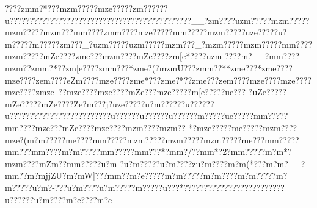 {{{{{{{{{{{{{{{{{{{{{{{{{{{{{{{{{{{{{{{{{{{{{{{{{{{{{{{{{{{{{{{{{{{{{{{{{{{{{{{{{{{{{{{{{{{{{{{{{{{{{{{{{{{{{{{{{{{{{{{{{{{{{{{{{{{{{{{{{{{{{{{{{{{{{{{{{{{{{{{{{{{{{{{{{{{{{{{{{{{{{{{{{{{{{{{{{{{{{{{{{{{{{{{{{{{{{{{{{{{{{{{{{{{{{{{{{{{{{{{{{{{{{{{{{{{{{{{{{{{{{{{{{{{{{{{{{{{{{{{{{{{{{{{{{{{{{{{{{{{{{{{{{{{{{{{{{{{{{{{{{{{{{{{{{{{{{{{{{{{{{{{{{{{{{{{{{{{{{{{{{{{{{{{{{{{{{{{{{{{{{{{{{{{{{{{{{{{{{{{{{{{{{{{{{{{{{{{{{{{{{{{{{{{{{{{{{{{{{{{{{{{{{{{{{{{{{{{{{{{{{{{{{{{{{{{{{{{{{{{{{{{{{{{{{{{{{{{{{{{{{{{{{{{{{{{{{{{{{{{{{{{{{{{{{{{{{{{{{{{{{{{{{{{{{{{{{{{{{{{{{{{{{{{{{{{{{{{{{{{{{{{{{{{{{{{{{{{{{{{{{{{{{{{{{{{{{{{{{{{{{{{{{{{{{{{{{{{{{{{{{{{{{{{{{{{{{{{{{{{{{{{{{{{{{{{{{{{{{{{{{{{{{{{{{{{{{{{{{{{{{{{{{{{{{{{{{{{{{{{{{{{{{{{{{{{{{{{{{{{{{{{{{{{{{{{{{{{{{{{{{{{{{{{{{{{{{{{{{{{{{{{{{{{{{{{{{{{{{{{{{{{{{{{{{{{{{{{{{{{{{{{{{{{{{{{{{{{{{{{{{{{{{{{{{{{{{{{{{{{{{{{{{{{{{{{{{{{{{{{{{{{{{{{{{{{{{{{{{{{{{{{{{{{{{{{{{{{{{{{{{{{{{{{{{{{{{{{{{{{{{{{{{{{{{{{{{{{{{{{{{{{{{{{{{{{{{{{{{{{{{{{{{{{{{{{{{{{{{{{{{{{{{{{{{{{{{{{{{{{{{{{{{{{{{{{{{{{{{{{{{{{{{{{{{{{{{{{{{{{{{{{{{{{{{{{{{{{{{{{{{{{{{{{{{{{{{{{{{{{{{{{{{{{{{{{{{{{{{{{{{{{{{{{{{{{{{{{{{{{{{{{{{{{{{{{{{{{{{{{{{{{{{{{{{{{{{{{{{{{{{{{{{{{{{{{{{{{{{{{{{{{{{{{{{{{{{{{{{{{{{{{{{{{{{{{{{{{{{{{{{{{{{{{{{{{{{{{{{{{{{{{{{{{{{{{{{{{{{{{{{{{{{{{{{{{{{{{{{{{{{{{{{{{{{{{{{{{{{{{{{{{{{{{{{{{{{{{{{{{{{{{{{{{{{{{{{{{{{{{{{{{{{{{{{{{{{{{{{{{{{{{{{{{{{{{{{{{{{{{{{{{{{{{{{{{{{{{{{{{{{{{{{{{{{{{{{{{{{{{{{{{{{{{{{{{{{{{{{{{{{{{{{{{{{{{{{{{{{{{{{{{{{{{{{{{{{{{{{{{{{{{{{{{{{{{{{{{{{{{{{{{{{{{{{{{{{{{{{{{{{{{{{{{{{{{{{{{{{{{{{{{{{{{{{{{{{{{{{{{{{{{{{{{{{{{{{{{{{{{{{{{{{{{{{{{{{{{{{{{{{{{{{{{{{{{{{{{{{{{{{{{{{{{{{{{{{{{{{{{{{{{{{{{{{{{{{{{{{{{{{{{{{{{{{{{{{{{{{{{{{{{{{{{{{{{{{{{{{{{{{{{{{{{{{{{{{{{{{{{{{{{{{{{{{{{{{{{{{{{{{{{{{{{{{{{{{{{{{{{{{{{{{{{{{{{{{{{{{{{{{{{{{{{{{{{{{{{{{{{{{{{{{{{{{{{{{{{{{{{{{{{{{{{{{{{{{{{{{{{{{{{{{{{{{{{{{{{{{{{{{{{{{{{{{{{{{{{{{{{{{{{{{{{{{{{{{{{{{{{{{{{{{{{{{{{{{{{{{{{{{{{{{{{{{{{{{{{{{{{{{{{{{{{{{{{{{{{{{{{{{{{{{{{{{{{{{{{{{{{{{{{{{{{{{{{{{{{{{{{{{{{{{{{{{{{{{{{{{{{{{{{{{{{{{{{{{{{{{{{{{{{{{{{{{{{{{{{{{{{{{{{{{{{{{{{{{{{{{{{{{{{{{{{{{{{{{{{{{{{{{{{{{{{{{{{{{{{{{{{{{{{{????zm{m?*???mzm?????mze?????}zm?????}?u??????}?????????????????????????????????????}??__?}zm????uzm?????mzm?????mzm?????mzm???m{m????zm{m????{mze?????m{m?????mzm?????uze?????u?m????}?m?????}zm???_?uzm?????uzm?????mzm???_?mzm?????mzm?????m{m????mzm?????mZe????zm{e???{mzm????{mZe????zm[e*????uzm-???}?m?__?m{m ????mzm??zm{m?*??zm[e????zm{m???*zm{e ? (?mzmU???zm{m??**zm{e???*zm{e????{mze????ze{m????{eZm????{mze????zm{e*???zm{e?*??zm{e ???ze{m????{mze????{mze????{mze????zmze~??{mze????{mze????mZe???mze?????m[e?????u{e???
?uZe?????mZe?????mZe????Ze?m???j?uze?????u?m?????}?u??????u???????}???????}?????}??????u??????u?????}?u?????}?m?????u{e?????m{m?????m{m????mze???mZe????{mze????{mzm????{mzm??
*?mze?????m{e?????mzm????{mze? ({m?m?????m{e??? ?m{m?????mzm?????mzm?????mzm?????m{e???m{m?????m{m???m{m????{m?m?????m{m?????m{m???*?m{m?/ ??m{m *?2?m{m?????m?m * ?mzm????mZm??m{m?????u?m
?u?m?????u?m????zu?m????m?m(*???m?m?__?m{m?? {m?mjjZU?m?mW]???m{m?   ?m?e?????m?m?????m?m????m?m?????m?m?????u?m?-???u?m ????u?m????}?m??? ?}?u???*??}??????}??????}??????}?????u?}?????u?m????m?e ????m?e
  }}}}}}}}}}}}}}}}}}}}}}}}}}}}}}}}}}}}}}}}}}}}}}}}}}}}}}}}}}}}}}}}}}}}}}}}}}}}}}}}}}}}}}}}}}}}}}}}}}}}}}}}}}}}}}}}}}}}}}}}}}}}}}}}}}}}}}}}}}}}}}}}}}}}}}}}}}}}}}}}}}}}}}}}}}}}}}}}}}}}}}}}}}}}}}}}}}}}}}}}}}}}}}}}}}}}}}}}}}}}}}}}}}}}}}}}}}}}}}}}}}}}}}}}}}}}}}}}}}}}}}}}}}}}}}}}}}}}}}}}}}}}}}}}}}}}}}}}}}}}}}}}}}}}}}}}}}}}}}}}}}}}}}}}}}}}}}}}}}}}}}}}}}}}}}}}}}}}}}}}}}}}}}}}}}}}}}}}}}}}}}}}}}}}}}}}}}}}}}}}}}}}}}}}}}}}}}}}}}}}}}}}}}}}}}}}}}}}}}}}}}}}}}}}}}}}}}}}}}}}}}}}}}}}}}}}}}}}}}}}}}}}}}}}}}}}}}}}}}}}}}}}}}}}}}}}}}}}}}}}}}}}}}}}}}}}}}}}}}}}}}}}}}}}}}}}}}}}}}}}}}}}}}}}}}}}}}}}}}}}}}}}}}}}}}}}}}}}}}}}}}}}}}}}}}}}}}}}}}}}}}}}}}}}}}}}}}}}}}}}}}}}}}}}}}}}}}}}}}}}}}}}}}}}}}}}}}}}}}}}}}}}}}}}}}}}}}}}}}}}}}}}}}}}}}}}}}}}}}}}}}}}}}}}}}}}}}}}}}}}}}}}}}}}}}}}}}}}}}}}}}}}}}}}}}}}}}}}}}}}}}}}}}}}}}}}}}}}}}}}}}}}}}}}}}}}}}}}}}}}}}}}}}}}}}}}}}}}}}}}}}}}}}}}}}}}}}}}}}}}}}}}}}}}}}}}}}}}}}}}}}}}}}}}}}}}}}}}}}}}}}}}}}}}}}}}}}}}}}}}}}}}}}}}}}}}}}}}}}}}}}}}}}}}}}}}}}}}}}}}}}}}}}}}}}}}}}}}}}}}}}}}}}}}}}}}}}}}}}}}}}}}}}}}}}}}}}}}}}}}}}}}}}}}}}}}}}}}}}}}}}}}}}}}}}}}}}}}}}}}}}}}}}}}}}}}}}}}}}}}}}}}}}}}}}}}}}}}}}}}}}}}}}}}}}}}}}}}}}}}}}}}}}}}}}}}}}}}}}}}}}}}}}}}}}}}}}}}}}}}}}}}}}}}}}}}}}}}}}}}}}}}}}}}}}}}}}}}}}}}}}}}}}}}}}}}}}}}}}}}}}}}}}}}}}}}}}}}}}}}}}}}}}}}}}}}}}}}}}}}}}}}}}}}}}}}}}}}}}}}}}}}}}}}}}}}}}}}}}}}}}}}}}}}}}}}}}}}}}}}}}}}}}}}}}}}}}}}}}}}}}}}}}}}}}}}}}}}}}}}}}}}}}}}}}}}}}}}}}}}}}}}}}}}}}}}}}}}}}}}}}}}}}}}}}}}}}}}}}}}}}}}}}}}}}}}}}}}}}}}}}}}}}}}}}}}}}}}}}}}}}}}}}}}}}}}}}}}}}}}}}}}}}}}}}}}}}}}}}}}}}}}}}}}}}}}}}}}}}}}}}}}}}}}}}}}}}}}}}}}}}}}}}}}}}}}}}}}}}}}}}}}}}}}}}}}}}}}}}}}}}}}}}}}}}}}}}}}}}}}}}}}}}}}}}}}}}}}}}}}}}}}}}}}}}}}}}}}}}}}}}}}}}}}}}}}}}}}}}}}}}}}}}}}}}}}}}}}}}}}}}}}}}}}}}}}}}}}}}}}}}}}}}}}}}}}}}}}}}}}}}}}}}}}}}}}}}}}}}}}}}}}}}}}}}}}}}}}}}}}}}}}}}}}}}}}}}}}}}}}}}}}}}}}}}}}}}}}}}}}}}}}}}}}}}}}}}}}}}}}}}}}}}}}}}}}}}}}}}}}}}}}}}}}}}}}}}}}}}}}}}}}}}}}}}}}}}}}}}}}}}}}}}}}}}}}}}}}}}}}}}}}}}}}}}}}}}}}}}}}}}}}}}}}}}}}}}}}}}}}}}}}}}}}}}}}}}}}}}}}}}}}}}}}}}}}}}}}}}}}}}}}}}}}}}}}}}}}}}}}}}}}}}}}}}}}}}}}}}}}}}}}}}}}}}}}}}}}}}}}}}}}}}}}}}}}}}}}}}}}}}}}}}}}}}}}}}}}}}}}}}}}}}}}}}}}}}}}}}}}}}}}}}}}}}}}}}}}}}}}}}}}}}}}}}}}}}}}}}}}}}}}}}}}}}}}}}}}}}}}}}}}}}}}}}}}}}}}}}
